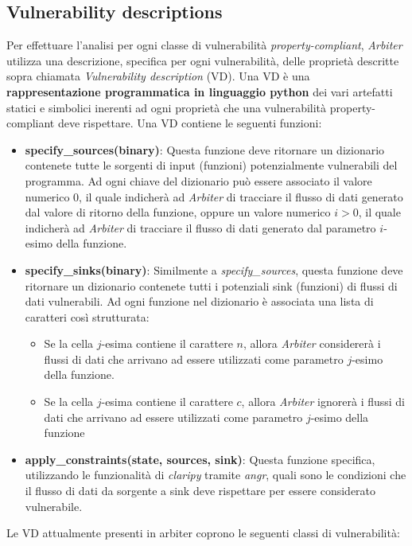 \documentclass[../main.tex]{subfiles}
\begin{document}
\subsection{Vulnerability descriptions} 
Per effettuare l'analisi per ogni classe di vulnerabilità \textit{property-compliant}, \textit{Arbiter} utilizza una descrizione, specifica per ogni vulnerabilità, delle proprietà descritte sopra chiamata \textit{Vulnerability description} (VD).
Una VD è una \textbf{rappresentazione programmatica in linguaggio python} dei vari artefatti statici e simbolici inerenti ad ogni proprietà che una vulnerabilità property-compliant deve rispettare.
Una VD contiene le seguenti funzioni:
\begin{itemize}
    \item \textbf{specify\_sources(binary)}: Questa funzione deve ritornare un dizionario contenete tutte le sorgenti di input (funzioni) potenzialmente vulnerabili del programma. Ad ogni chiave del dizionario può
    essere associato il valore numerico $0$, il quale indicherà ad \textit{Arbiter} di tracciare il flusso di dati generato dal valore di ritorno della funzione, oppure un valore numerico $i > 0$, il quale indicherà ad \textit{Arbiter} di
    tracciare il flusso di dati generato dal parametro $i$-esimo della funzione.
    \item \textbf{specify\_sinks(binary)}: Similmente a \textit{specify\_sources}, questa funzione deve ritornare un dizionario contenete tutti i potenziali sink (funzioni) di flussi di dati vulnerabili. Ad ogni funzione nel dizionario è associata una lista di caratteri così strutturata:
    \begin{itemize}
        \item Se la cella $j$-esima contiene il carattere $n$, allora \textit{Arbiter} considererà i flussi di dati che arrivano ad essere utilizzati come parametro $j$-esimo della funzione.
        \item Se la cella $j$-esima contiene il carattere $c$, allora \textit{Arbiter} ignorerà i flussi di dati che arrivano ad essere utilizzati come parametro $j$-esimo della funzione
    \end{itemize}
    \item \textbf{apply\_constraints(state, sources, sink)}: Questa funzione specifica, utilizzando le funzionalità di \textit{claripy} tramite \textit{angr}, quali sono le condizioni che il flusso di dati da sorgente a sink deve rispettare
    per essere considerato vulnerabile.
\end{itemize}
Le VD attualmente presenti in arbiter coprono le seguenti classi di vulnerabilità:
\end{document}
